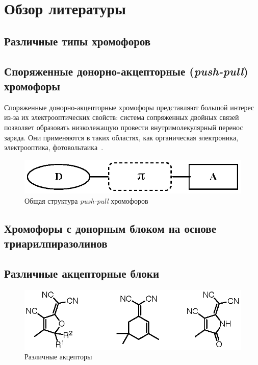 \section{Обзор литературы}

\subsection{Различные типы хромофоров}

\subsection{Споряженные донорно-акцепторные (\emph{push-pull}) хромофоры}


Споряженные донорно-акцепторные хромофоры представляют большой интерес из-за их электрооптических свойств: система сопряженных двойных связей позволяет образовать низколежащую провести внутримолекулярный перенос заряда. Они применяются в таких областях, как органическая электроника, электрооптика, фотовольтаика~\cite{Bures2014a}.

\begin{figure}
    \centering
    \includegraphics{sections/literature/img/D-p-A_chromophores.eps}
    \caption{Общая структура \emph{push-pull} хромофоров}
\end{figure}

\subsection{Хромофоры с донорным блоком на основе триарилпиразолинов}

\subsection{Различные акцепторные блоки}

\begin{figure}
    \centering
    \includegraphics{sections/literature/img/acceptors.eps}
    \caption{Различные акцепторы~\cite{Dalton2010a}}
\end{figure}

